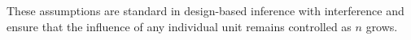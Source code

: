 \documentclass[twoside,letterpaper]{article}
\theoremstyle{plain}
\theoremstyle{definition}
\theoremstyle{remark}
\def\T{{\textsc{t}}}
\newcommand{\bG}{\boldsymbol{G}}
\newcommand{\cN}{\mathcal{N}}
\begin{document}
These assumptions are standard in design-based inference with interference and ensure that the influence of any individual unit remains controlled as $n$ grows.



\end{document}
